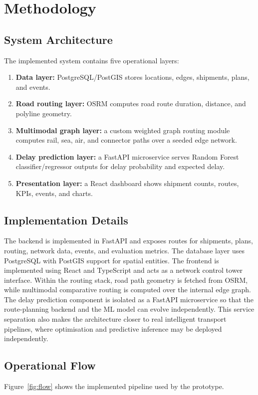 \section{Methodology}
\subsection{System Architecture}
The implemented system contains five operational layers:
\begin{enumerate}
    \item \textbf{Data layer:} PostgreSQL/PostGIS stores locations, edges, shipments, plans, and events.
    \item \textbf{Road routing layer:} OSRM computes road route duration, distance, and polyline geometry.
    \item \textbf{Multimodal graph layer:} a custom weighted graph routing module computes rail, sea, air, and connector paths over a seeded edge network.
    \item \textbf{Delay prediction layer:} a FastAPI microservice serves Random Forest classifier/regressor outputs for delay probability and expected delay.
    \item \textbf{Presentation layer:} a React dashboard shows shipment counts, routes, KPIs, events, and charts.
\end{enumerate}

\subsection{Implementation Details}
The backend is implemented in FastAPI and exposes routes for shipments, plans, routing, network data, events, and evaluation metrics. The database layer uses PostgreSQL with PostGIS support for spatial entities. The frontend is implemented using React and TypeScript and acts as a network control tower interface. Within the routing stack, road path geometry is fetched from OSRM, while multimodal comparative routing is computed over the internal edge graph. The delay prediction component is isolated as a FastAPI microservice so that the route-planning backend and the ML model can evolve independently. This service separation also makes the architecture closer to real intelligent transport pipelines, where optimisation and predictive inference may be deployed independently.

\subsection{Operational Flow}
Figure~\ref{fig:flow} shows the implemented pipeline used by the prototype.

